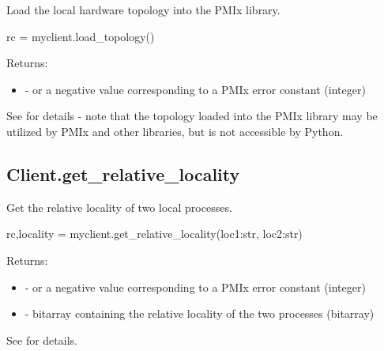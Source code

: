 \summary
Load the local hardware topology into the \ac{PMIx} library.

\format

\pyspecificstart
\begin{codepar}
rc = myclient.load_topology()
\end{codepar}
\pyspecificend

Returns:

\begin{itemize}
    \item {} -  or a negative value corresponding to a PMIx error constant (integer)
\end{itemize}

See  for details - note that the topology loaded into the \ac{PMIx} library may be utilized by \ac{PMIx} and other libraries, but is not accessible by Python.


\subsection{Client.get_relative_locality}

\summary
Get the relative locality of two local processes.

\format

\pyspecificstart
\begin{codepar}
rc,locality = myclient.get_relative_locality(loc1:str, loc2:str)
\end{codepar}
\pyspecificend

\begin{arglist}
\end{arglist}


Returns:

\begin{itemize}
    \item {} -  or a negative value corresponding to a PMIx error constant (integer)
    \item {} -  bitarray containing the relative locality of the two processes (bitarray)
\end{itemize}

See  for details.


